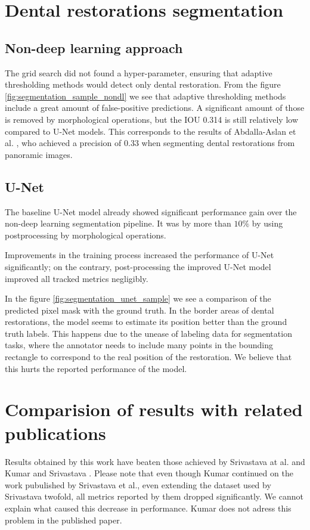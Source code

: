 \section{Dental restorations segmentation}
\subsection{Non-deep learning approach}
The grid search did not found a hyper-parameter, ensuring that adaptive thresholding methods would detect only dental restoration. From the figure \ref{fig:segmentation_sample_nondl} we see that adaptive thresholding methods include a great amount of false-positive predictions. A significant amount of those is removed by morphological operations, but the IOU 0.314 is still relatively low compared to U-Net models. This corresponds to the results of Abdalla-Aslan et al. \cite{AbdallaAslan2020}, who achieved a precision of 0.33 when segmenting dental restorations from panoramic images.
\subsection{U-Net}
The baseline U-Net model already showed significant performance gain over the non-deep learning segmentation pipeline. It was by more than $10\%$ by using postprocessing by morphological operations.

Improvements in the training process increased the performance of U-Net significantly; on the contrary, post-processing the improved U-Net model improved all tracked metrics negligibly.

In the figure \ref{fig:segmentation_unet_sample} we see a comparison of the predicted pixel mask with the ground truth. In the border areas of dental restorations, the model seems to estimate its position better than the ground truth labels. This happens due to the unease of labeling data for segmentation tasks, where the annotator needs to include many points in the bounding rectangle to correspond to the real position of the restoration. We believe that this hurts the reported performance of the model.



\section{Comparision of results with related publications}

Results obtained by this work have beaten those achieved by Srivastava at al. \cite{Srivastava2017} and Kumar and Srivastava \cite{Kumar}. Please note that even though Kumar continued on the work pubulished by Srivastava et al., even extending the dataset used by Srivastava twofold, all metrics reported by them dropped significantly. We cannot explain what caused this decrease in performance. Kumar does not adress this problem in the published paper.

